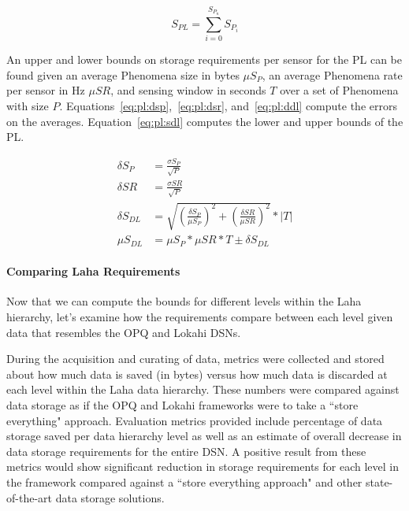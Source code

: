 \begin{equation}\label{eq:pl}
	S_{PL} = \sum_{i=0}^{S_{P_{n}}} S_{P_{i}}
\end{equation}

An upper and lower bounds on storage requirements per sensor for the PL can be found given an average Phenomena size in bytes $\mu S_{P}$, an average Phenomena rate per sensor in Hz $\mu SR$, and sensing window in seconds $T$ over a set of Phenomena with size $P$. Equations~\ref{eq:pl:dsp},~\ref{eq:pl:dsr}, and~\ref{eq:pl:ddl} compute the errors on the averages. Equation~\ref{eq:pl:sdl} computes the lower and upper bounds of the PL\@.

\begin{align}
	\delta S_{P} &= \frac{\sigma S_{P}}{\sqrt{P}} \label{eq:pl:dsp} \\
	\delta SR &= \frac{\sigma SR}{\sqrt{P}} \label{eq:pl:dsr} \\
	\delta S_{DL} &= \sqrt{(\frac{\delta S_{P}}{\mu S_{P}})^2 + (\frac{\delta SR}{\mu SR})^2} * |T| \label{eq:pl:ddl} \\
	\mu S_{DL} &= \mu S_{P} * \mu SR * T \pm \delta S_{DL} \label{eq:pl:sdl}
\end{align}


\paragraph{Comparing Laha Requirements}

Now that we can compute the bounds for different levels within the Laha hierarchy, let's examine how the requirements compare between each level given data that resembles the OPQ and Lokahi DSNs.


During the acquisition and curating of data, metrics were collected and stored about how much data is saved (in bytes) versus how much data is discarded at each level within the Laha data hierarchy. These numbers were compared against data storage as if the OPQ and Lokahi frameworks were to take a ``store everything" approach. Evaluation metrics provided include percentage of data storage saved per data hierarchy level as well as an estimate of overall decrease in data storage requirements for the entire DSN. A positive result from these metrics would show significant reduction in storage requirements for each level in the framework compared against a ``store everything approach" and other state-of-the-art data storage solutions.

